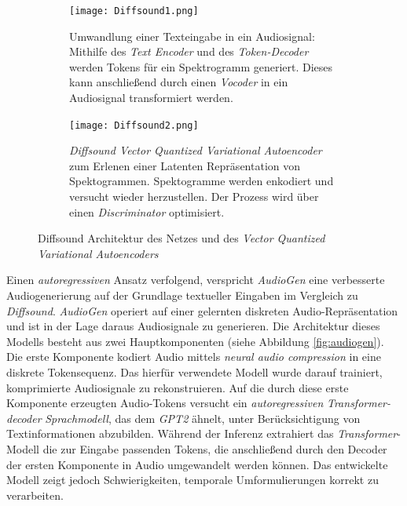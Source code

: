 \documentclass[
  a4paper,  %
  twoside,  %
  bibliography=totoc,
  headsepline,
  cleardoublepage=empty,
  parskip=half,
  draft=false
]{scrbook}
\begin{document}
\begin{figure}[h]
\centering
\begin{subfigure}{1.0\textwidth}
  \centering
  \texttt{[image: Diffsound1.png]}
  \caption[Diffsound Architektur]{Umwandlung einer Texteingabe in ein Audiosignal: Mithilfe des \emph{Text Encoder} und des \emph{Token-Decoder} werden Tokens für ein Spektrogramm generiert. Dieses kann anschließend durch einen \emph{Vocoder} in ein Audiosignal transformiert werden. \cite{yang_diffsound_2023}
}
  \label{fig:DiffsoundArchitecture}
\end{subfigure}

\vspace{1em} %

\begin{subfigure}{1.0\textwidth}
  \centering
  \texttt{[image: Diffsound2.png]}
  \caption[Diffsound VQ-VAE]{\emph{Diffsound Vector Quantized Variational Autoencoder} zum Erlenen einer Latenten Repräsentation von Spektogrammen. Spektogramme werden enkodiert und versucht wieder herzustellen. Der Prozess wird über einen \emph{Discriminator} optimisiert. \cite{yang_diffsound_2023}}
  \label{fig:VQVAE}
\end{subfigure}
\caption[Diffsound Architektur]{Diffsound Architektur des Netzes und des \emph{Vector Quantized Variational Autoencoders} \cite{yang_diffsound_2023}}
\label{fig:test}
\end{figure}

Einen \emph{autoregressiven} Ansatz verfolgend, verspricht \emph{AudioGen} \cite{kreuk_audiogen_2023} eine verbesserte Audiogenerierung auf der Grundlage textueller Eingaben im Vergleich zu \emph{Diffsound}. \emph{AudioGen} operiert auf einer gelernten diskreten Audio-Repräsentation und ist in der Lage daraus Audiosignale zu generieren. Die Architektur dieses Modells besteht aus zwei Hauptkomponenten (siehe Abbildung \ref{fig:audiogen}). Die erste Komponente kodiert Audio mittels \emph{neural audio compression} \cite{zeghidour_soundstream_2021} in eine diskrete Tokensequenz. Das hierfür verwendete Modell wurde darauf trainiert, komprimierte Audiosignale zu rekonstruieren. Auf die durch diese erste Komponente erzeugten Audio-Tokens versucht ein \emph{autoregressiven} \emph{Transformer-decoder} \emph{Sprachmodell}, das dem \emph{GPT2} \cite{alec_radford_jeff_wu_rewon_child_david_luan_dario_amodei_ilya_sutskever_language_2019} ähnelt, unter Berücksichtigung von Textinformationen abzubilden. Während der Inferenz extrahiert das \emph{Transformer}-Modell die zur Eingabe passenden Tokens, die anschließend durch den Decoder der ersten Komponente in Audio umgewandelt werden können. Das entwickelte Modell zeigt jedoch Schwierigkeiten, temporale Umformulierungen korrekt zu verarbeiten. \cite{kreuk_audiogen_2023}
\end{document}
